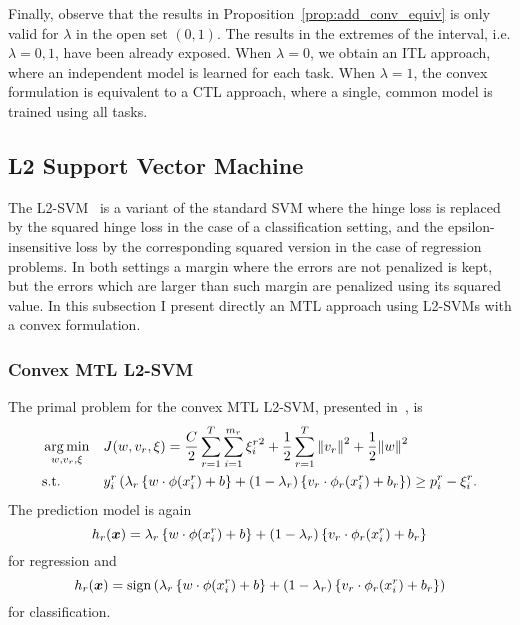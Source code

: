 Finally, observe that the results in Proposition~\ref{prop:add_conv_equiv} is only valid for $\lambda$ in the open set $(0, 1)$. The results in the extremes of the interval, i.e. $\lambda=0, 1$, have been already exposed. When $\lambda=0$, we obtain an ITL approach, where an independent model is learned for each task. When $\lambda=1$, the convex formulation is equivalent to a CTL approach, where a single, common model is trained using all tasks.


\subsection{L2 Support Vector Machine}
The L2-SVM~\cite{Burges98} is a variant of the standard SVM where the hinge loss is replaced by the squared hinge loss in the case of a classification setting, and the epsilon-insensitive loss by the corresponding squared version in the case of regression problems. In both settings a margin where the errors are not penalized is kept, but the errors which are larger than such margin are penalized using its squared value.
In this subsection I present directly an MTL approach using L2-SVMs with a convex formulation.

\subsubsection{{Convex} MTL L2-SVM}
The primal problem for the convex MTL L2-SVM, presented in~\cite{RuizAD21}, is
\begin{equation}\label{eq:svmmtl_primal_convex_l2}
    \begin{aligned}
    & \argmin_{w, {v}_r, \xi}
    & & {J({w}, {v}_r, \xi) = \frac{C}{2} \sum_{r= 1}^T \sum_{i=1}^{m_r} {\xi_{i}^r}^2 + \frac{1}{2} \sum_{r= 1}^T{\norm{{v}_r}^2} + \frac{1}{2} {\norm{{w}}}^2} \\
    & \text{s.t.}
    & & y_{i}^r \left(\lambda_r \left\lbrace {w} \cdot \phi(x_{i}^r) + b  \right\rbrace + (1 - \lambda_r) \left\lbrace {v}_r \cdot \phi_r(x_{i}^r) + b_r \right\rbrace  \right) \geq p_{i}^r - \xi_{i}^r .  \\
    \end{aligned}
\end{equation}
The prediction model is again
\begin{equation}
    \nonumber
    h_r(\bm{x}) = \lambda_r \left\lbrace {w} \cdot \phi(x_{i}^r) + b  \right\rbrace + (1 - \lambda_r) \left\lbrace {v}_r \cdot \phi_r(x_{i}^r) + b_r \right\rbrace
\end{equation}
for regression and 
\begin{equation}
    \nonumber
    h_r(\bm{x}) = \operatorname{sign}{ \left(\lambda_r \left\lbrace {w} \cdot \phi(x_{i}^r) + b  \right\rbrace + (1 - \lambda_r) \left\lbrace {v}_r \cdot \phi_r(x_{i}^r) + b_r \right\rbrace \right)}
\end{equation}
for classification.
%

